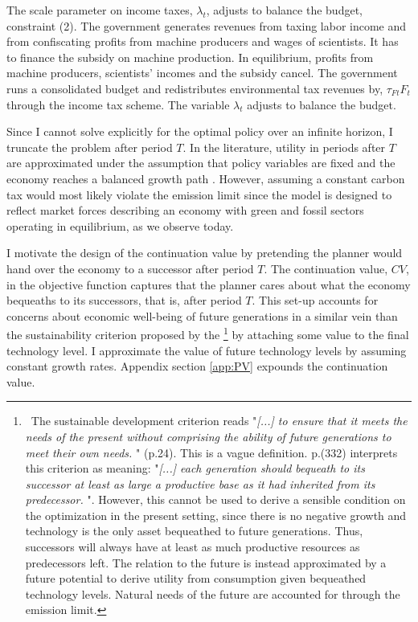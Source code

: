The scale parameter on income taxes, $\lambda_t$, adjusts to balance the budget, constraint (2).
The government generates revenues from taxing labor income and from confiscating profits from machine producers and wages of scientists. It has to finance the subsidy on machine production. In equilibrium, profits from machine producers, scientists' incomes and the subsidy cancel.
The government runs a consolidated budget and redistributes environmental tax revenues by, $\tau_{Ft}F_t$ through the income tax scheme.
The variable $\lambda_t$ adjusts to balance the budget. 


Since I cannot solve explicitly for the optimal policy over an infinite horizon, I truncate the problem after period $T$. 
In the literature, utility in periods after $T$ are approximated under the assumption that policy variables are fixed and the economy reaches a balanced growth path \citep{Barrage2019OptimalPolicy, Jones1993OptimalGrowth}. However, assuming a constant carbon tax would most likely violate the emission limit since the model is designed to reflect market forces describing an economy with green and fossil sectors operating in equilibrium, as we observe today.

I motivate the design of the continuation value by pretending the planner would hand over the economy to a successor after period $T$. The continuation value, $CV$, in the objective function captures that the planner cares about what the economy bequeaths to its successors, that is, after period $T$. 
This set-up accounts for concerns about economic well-being of future generations in a similar vein than the sustainability criterion proposed by the \cite{UNSUS}\footnote{\ The sustainable development criterion reads "\textit{[...] to ensure that it meets the needs of the present without comprising the ability of future generations to meet their own needs.
	}" (p.24). This is a vague definition.  \cite{Dasgupta2021} p.(332) interprets this criterion as meaning: 
	"\textit{[...] each generation should bequeath to its successor at least as large a productive base as it had inherited from its predecessor. }". 
	However, this cannot be used to derive a sensible condition on the optimization in the present setting, since there is no negative growth and technology is the only asset bequeathed to future generations. Thus,
	successors will always have at least as much productive resources as predecessors left. The relation to the future is instead approximated by a future potential to derive utility from consumption given bequeathed technology levels. Natural needs of the future are accounted for through the emission limit. } by attaching some value to the final technology level. I approximate the value of future technology levels by assuming constant growth rates.  Appendix section \ref{app:PV} expounds  the continuation value.

